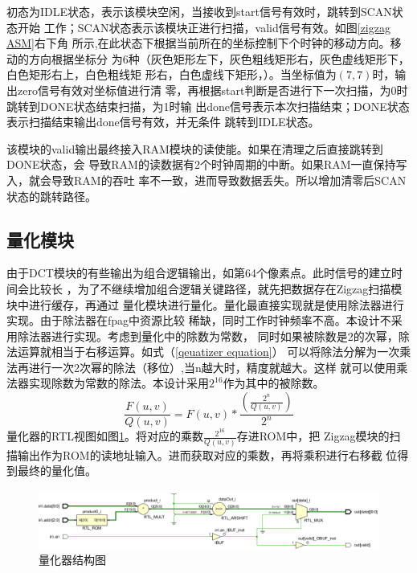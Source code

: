\documentclass{article}
\numberwithin {equation}{section}
\begin{document}
\begin{spacing}{1.25}
        初态为IDLE状态，表示该模块空闲，当接收到start信号有效时，跳转到SCAN状态开始
        工作；SCAN状态表示该模块正进行扫描，valid信号有效。如图\ref{zigzag ASM}右下角
        所示,在此状态下根据当前所在的坐标控制下个时钟的移动方向。移动的方向根据坐标分
        为6种（灰色矩形左下，灰色粗线矩形右，灰色虚线矩形下，白色矩形右上，白色粗线矩
        形右，白色虚线下矩形，）。当坐标值为$(7,7)$时，输出zero信号有效对坐标值进行清
        零，再根据start判断是否进行下一次扫描，为0时跳转到DONE状态结束扫描，为1时输
        出done信号表示本次扫描结束；DONE状态表示扫描结束输出done信号有效，并无条件
        跳转到IDLE状态。

        该模块的valid输出最终接入RAM模块的读使能。如果在清理之后直接跳转到DONE状态，会
        导致RAM的读数据有2个时钟周期的中断。如果RAM一直保持写入，就会导致RAM的吞吐
        率不一致，进而导致数据丢失。所以增加清零后SCAN状态的跳转路径。
  \subsection{量化模块}
      由于DCT模块的有些输出为组合逻辑输出，如第64个像素点。此时信号的建立时间会比较长
      ，为了不继续增加组合逻辑关键路径，就先把数据存在Zigzag扫描模块中进行缓存，再通过
      量化模块进行量化。量化最直接实现就是使用除法器进行实现。由于除法器在fpag中资源比较
      稀缺，同时工作时钟频率不高。本设计不采用除法器进行实现。考虑到量化中的除数为常数，
      同时如果被除数是2的次幂，除法运算就相当于右移运算。如式（\ref{qeuatizer equation}）
      可以将除法分解为一次乘法再进行一次2次幂的除法（移位）,当n越大时，精度就越大。这样
      就可以使用乘法器实现除数为常数的除法。本设计采用$2^{16}$作为其中的被除数。
      \begin{equation}
        \frac{F(u,v)}{Q(u,v)}=F(u,v)*\frac{\left(\frac{2^{n}}{Q(u,v)}\right)}{2^{n}}
        \label{qeuatizer equation}
      \end{equation}
      量化器的RTL视图如图\ref{quantizer}。将对应的乘数$\frac{2^{16}}{Q(u,v)}$存进ROM中，把
      Zigzag模块的扫描输出作为ROM的读地址输入。进而获取对应的乘数，再将乘积进行右移截
      位得到最终的量化值。
      \begin{figure}[H]
        \centering
        \includegraphics[scale=0.5]{./pictures/quantizer.png}
        \caption{量化器结构图}
        \label{quantizer}
      \end{figure}



\end{spacing}
\end{document}
